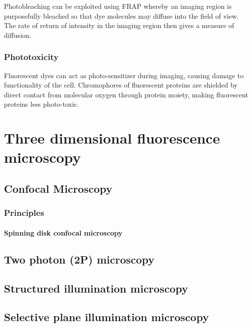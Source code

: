 Photobleaching can be exploited using FRAP whereby an imaging region is purposefully bleached so that dye molecules may diffuse into the field of view.
The rate of return of intensity in the imaging region then gives a measure of diffusion.



\subsubsection{Phototoxicity}

Fluorescent dyes can act as photo-sensitizer during imaging, causing damage to functionality of the cell.
Chromophores of fluorescent proteins are shielded by direct contact from molecular oxygen through protein moiety, making fluorescent proteins less photo-toxic.


\section{Three dimensional fluorescence microscopy}
\subsection{Confocal Microscopy}
\subsubsection{Principles}
\paragraph{Spinning disk confocal microscopy}
\subsection{Two photon (2P) microscopy}
\subsection{Structured illumination microscopy}
\subsection{Selective plane illumination microscopy}
